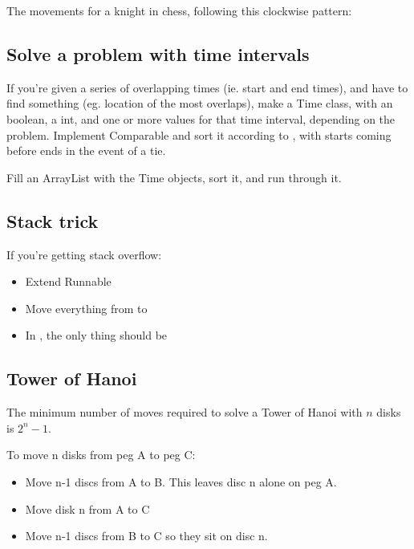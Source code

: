 The movements for a knight in chess, following this clockwise pattern:



\subsection*{Solve a problem with time intervals}

If you’re given a series of overlapping times (ie. start and end times), and have to find something (eg. location of the most overlaps), make a Time class, with an  boolean, a  int, and one or more values for that time interval, depending on the problem. Implement Comparable and sort it according to , with starts coming before ends in the event of a tie.

Fill an ArrayList with the Time objects, sort it, and run through it.

\subsection*{Stack trick}

If you're getting stack overflow:

\begin{itemize}
    \item Extend Runnable
    \item Move everything from  to 
    \item In , the only thing should be 
\end{itemize}

\subsection*{Tower of Hanoi}

The minimum number of moves required to solve a Tower of Hanoi with $n$ disks is $2^n - 1$.

To move n disks from peg A to peg C:

\begin{itemize}
    \item Move n-1 discs from A to B. This leaves disc n alone on peg A.
    \item Move disk n from A to C
    \item Move n-1 discs from B to C so they sit on disc n.
\end{itemize}

